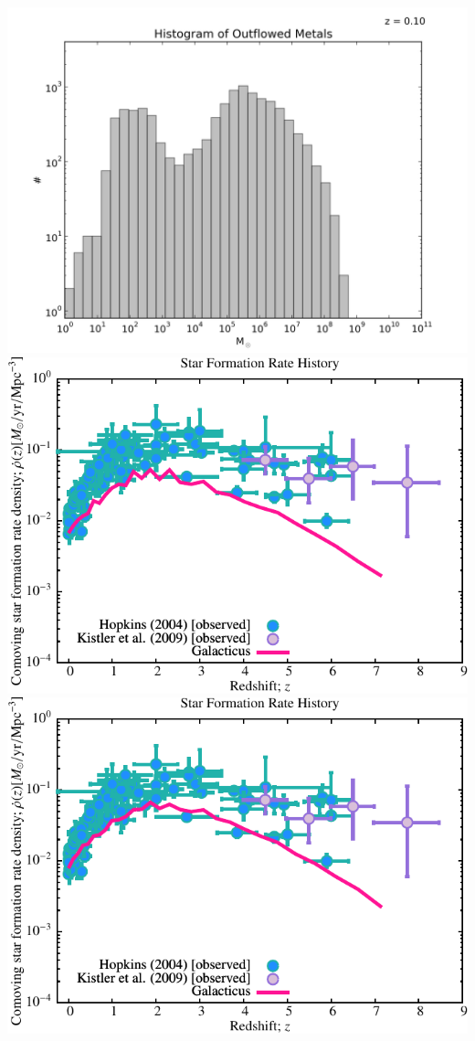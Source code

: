 \documentclass[a4paper,11pt,fleqn,oneside]{book}
\begin{document}
\begin{itemize}
\includegraphics[scale=0.5]{analysis/galacticus/histograms/Histogram_of_Outflowed_Metalsgalacticus_nestages_SLtest2_0000.png} \\
\includegraphics[scale=0.75]{r256/h70/nestages12/Plot_Star_Formation_History.pdf} \\
\includegraphics[scale=0.75]{r256/h70/nestages12_SLtest/Plot_Star_Formation_History.pdf} \\

\end{itemize}
\end{document}
